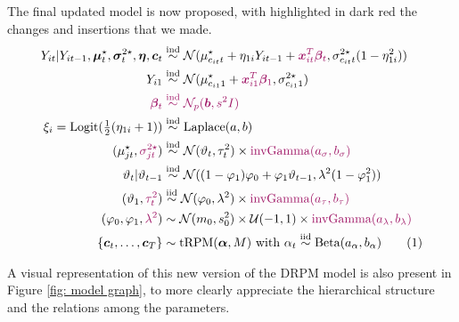 \documentclass[12pt,	%
	a4paper,		%
	twoside,		%
	openright,		%
	titlepage,%
	]{book}
\newcommand\numberthis{\addtocounter{equation}{1}\tag{\theequation}}
\theoremstyle{definition}
\begin{document}
The final updated model is now proposed, with highlighted in dark red the changes and insertions that we made.
\begin{align*}
Y_{it}|Y_{it-1},\vec{\mu}^{\star}_t,\vec{\sigma}^{2\star}_t, \vec{\eta},\vec{c}_t &\simind \mathcal{N}(\mu_{c_{it}t}^\star+\eta_{1i}Y_{it-1} + \alert{\vec{x}_{it}^T\vec{\beta}_t},\sigma^{2\star}_{c_{it}t}(1-\eta_{1i}^2)) \\
Y_{i1} &\simind \mathcal{N}(\mu^\star_{c_{i1}1}+ \alert{\vec{x}_{i1}^T\vec{\beta}_1},\sigma^{2\star}_{c_{i1}1})\\
%
\alert{\vec{\beta}_t} &\; \alert{\simind} \; \alert{\N_p(\vec{b},s^2 I)}\\
\xi_i = \text{Logit$(\tfrac{1}{2}(\eta_{1i}+1)$}) &\simind \text{Laplace$(a,b)$}\\
%
( \mu_{jt}^\star, \alert{\sigma_{jt}^{2\star}}) &\simind \N(\theta_t,\tau_t^2) \times \alert{\invgamma(a_\sigma,b_\sigma)}\\
%
\theta_t | \theta_{t-1} &\simind \N((1-\phi_1)\phi_0 + \phi_1\theta_{t-1},\lambda^2(1-\phi_1^2))\\
%
(\theta_1,\alert{\tau_t^2}) &\simiid \N(\phi_0,\lambda^2) \times  \alert{\invgamma (a_\tau,b_\tau)}\\
%
(\phi_0,\phi_1,\alert{\lambda^2}) &\sim \N(m_0,s_0^2) \times \U(-1,1) \times \alert{\invgamma (a_\lambda,b_\lambda)}\\
%
\{\vec{c}_t, \ldots, \vec{c}_T\} &\sim \text{tRPM}(\vec{\alpha}, M) \text{ with } \alpha_t \simiid \text{Beta}(a_\alpha, b_\alpha)
 \numberthis \label{jdrpm model}
\end{align*}

A visual representation of this new version of the DRPM model is also present in Figure \ref{fig: model graph}, to more clearly appreciate the hierarchical structure and the relations among the parameters.
\end{document}
